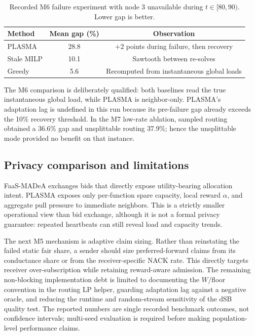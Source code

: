 \begin{table}[t]
\centering
\caption{Recorded M6 failure experiment with node 3 unavailable during
$t\in[80,90)$.  Lower gap is better.}
\label{tab:plasma-m6}
\begin{tabular}{lcc}
\toprule
Method & Mean gap (\%) & Observation \\
\midrule
PLASMA & 28.8 & $+2$ points during failure, then recovery \\
Stale MILP & 10.1 & Sawtooth between re-solves \\
Greedy & 5.6 & Recomputed from instantaneous global loads \\
\bottomrule
\end{tabular}
\end{table}

The M6 comparison is deliberately qualified: both baselines read the true
instantaneous global load, while PLASMA is neighbor-only.  PLASMA's adaptation
lag is undefined in this run because its pre-failure gap already exceeds the
10\% recovery threshold.  In the M7 low-rate ablation, sampled routing
obtained a 36.6\% gap and unsplittable routing 37.9\%; hence the unsplittable
mode provided no benefit on that instance.

\subsection{Privacy comparison and limitations}
FaaS-MADeA exchanges bids that directly expose utility-bearing allocation
intent.  PLASMA exposes only per-function spare capacity, local reward
$\alpha$, and aggregate pull pressure to immediate neighbors.  This is a
strictly smaller operational view than bid exchange, although it is not a
formal privacy guarantee: repeated heartbeats can still reveal load and
capacity trends.

The next M5 mechanism is adaptive claim sizing.  Rather than reinstating the
failed static fair share, a sender should size preferred-forward claims from
its conductance share or from the receiver-specific NACK rate.  This directly
targets receiver over-subscription while retaining reward-aware admission.
The remaining non-blocking implementation debt is limited to documenting the
$W$/floor convention in the routing LP helper, guarding adaptation lag against
a negative oracle, and reducing the runtime and random-stream sensitivity of
the dSB quality test.  The reported numbers are single recorded benchmark
outcomes, not confidence intervals; multi-seed evaluation is required before
making population-level performance claims.
